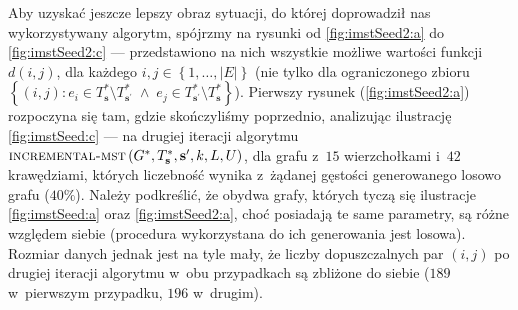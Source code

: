 Aby uzyskać jeszcze lepszy obraz sytuacji, do której doprowadził nas wykorzystywany algorytm, spójrzmy na rysunki od \ref{fig:imstSeed2:a} do \ref{fig:imstSeed2:c} --- przedstawiono na nich wszystkie możliwe wartości funkcji $d \left( i, j \right)$, dla każdego $i, j \in \left\{ 1, \dots, \left| E \right| \right\}$ (nie tylko dla ograniczonego zbioru $\left\{ \left( i, j \right) : e_{i} \in T^{\ast}_{\textbf{s}} \setminus T^{\ast}_{\textbf{s}^{\prime}} \; \wedge \; e_{j} \in T^{\ast}_{\textbf{s}^{\prime}} \setminus T^{\ast}_{\textbf{s}} \right\}$). Pierwszy rysunek (\ref{fig:imstSeed2:a}) rozpoczyna się tam, gdzie skończyliśmy poprzednio, analizując ilustrację \ref{fig:imstSeed:c} --- na drugiej iteracji algorytmu $\textsc{incremental-mst} \left( G^{\ast}, T^{\ast}_{\textbf{s}}, \textbf{s}^{\prime}, k, L, U \right)$, dla grafu z~$15$ wierzchołkami i~$42$ krawędziami, których liczebność wynika z~żądanej gęstości generowanego losowo grafu ($40\%$). Należy podkreślić, że obydwa grafy, których tyczą się ilustracje \ref{fig:imstSeed:a} oraz \ref{fig:imstSeed2:a}, choć posiadają te same parametry, są różne  względem siebie (procedura wykorzystana do ich generowania jest losowa). Rozmiar danych jednak jest na tyle mały, że liczby dopuszczalnych par $\left( i, j \right)$ po drugiej iteracji algorytmu w~obu przypadkach są zbliżone do siebie ($189$ w~pierwszym przypadku, $196$ w~drugim).

